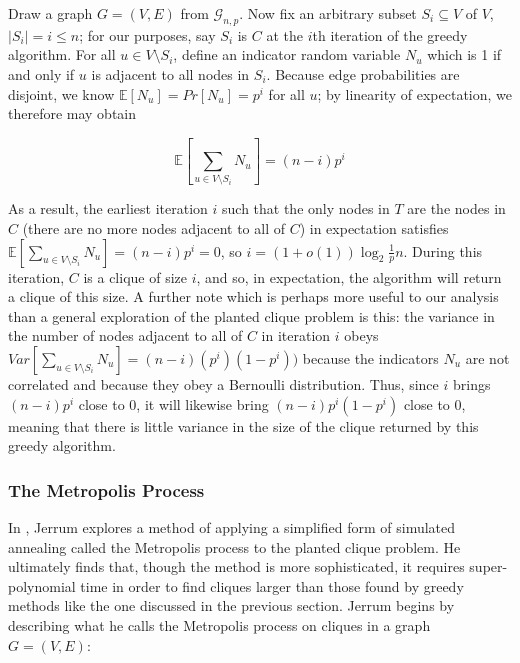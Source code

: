 \documentclass{article}
\theoremstyle{definition}
\begin{document}
Draw a graph $G=(V,E)$ from $\mathcal{G}_{n,p}$.  Now fix an arbitrary subset 
$S_i \subseteq V$ of $V$, $\lvert S_i \rvert = i \leq n$; for our purposes, say 
$S_i$ is $C$ at the $i$th iteration of the greedy algorithm.  For all $u \in V \setminus S_i$, 
define an indicator random variable $N_u$ which is 1 if and only if $u$ is adjacent 
to all nodes in $S_i$.  Because edge probabilities are disjoint, we know 
$\mathbb{E}[N_u] = Pr[N_u] = p^i$ for all $u$; by linearity of expectation, we therefore 
may obtain 

\[ \mathbb{E}[\sum_{u \in V \setminus S_i} N_u] = (n-i) p^i \]

As a result, the earliest iteration $i$ such that the only nodes in $T$ 
are the nodes in $C$ (there are no more nodes adjacent to all of $C$) in expectation
satisfies $\mathbb{E}[\sum_{u \in V \setminus S_i} N_u] = (n-i) p^i = 0$, so 
$i = (1+o(1)) \log_2{\frac{1}{p}}{n}$.  During this iteration, $C$ is a clique of size 
$i$, and so, in expectation, the algorithm will return a clique of this size.  
\newline\newline
A further note which is perhaps more useful to our analysis than a general 
exploration of the planted clique problem is this: the variance in the 
number of nodes adjacent to all of $C$ in iteration $i$ obeys 
$Var[\sum_{u \in V \setminus S_i} N_u] = (n-i) (p^i) (1-p^i))$ because the indicators 
$N_u$ are not correlated and because they obey a Bernoulli distribution.  Thus, since 
$i$ brings $(n-i)p^i$ close to 0, it will likewise bring $(n-i)p^i(1-p^i)$ close to 0, 
meaning that there is little variance in the size of the clique returned by this 
greedy algorithm.

\subsubsection{The Metropolis Process}

In \cite{Metropolis}, Jerrum explores a method of applying a simplified form 
of simulated annealing called the Metropolis process to the planted clique problem.  
He ultimately finds that, though the method is more sophisticated, it requires 
super-polynomial time in order to find cliques larger than those found by greedy 
methods like the one discussed in the previous section.  
\newline\newline
Jerrum begins by describing what he calls the Metropolis process on cliques
in a graph $G=(V,E)$:
\end{document}
